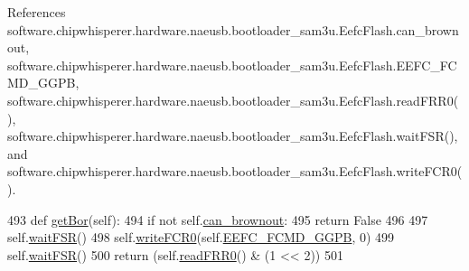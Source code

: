 References software.\+chipwhisperer.\+hardware.\+naeusb.\+bootloader\+\_\+sam3u.\+Eefc\+Flash.\+can\+\_\+brownout, software.\+chipwhisperer.\+hardware.\+naeusb.\+bootloader\+\_\+sam3u.\+Eefc\+Flash.\+E\+E\+F\+C\+\_\+\+F\+C\+M\+D\+\_\+\+G\+G\+P\+B, software.\+chipwhisperer.\+hardware.\+naeusb.\+bootloader\+\_\+sam3u.\+Eefc\+Flash.\+read\+F\+R\+R0(), software.\+chipwhisperer.\+hardware.\+naeusb.\+bootloader\+\_\+sam3u.\+Eefc\+Flash.\+wait\+F\+S\+R(), and software.\+chipwhisperer.\+hardware.\+naeusb.\+bootloader\+\_\+sam3u.\+Eefc\+Flash.\+write\+F\+C\+R0().


\begin{DoxyCode}
493     \textcolor{keyword}{def }\hyperlink{classsoftware_1_1chipwhisperer_1_1hardware_1_1naeusb_1_1bootloader__sam3u_1_1EefcFlash_a3050a591d5790e1414f45f43fc507f41}{getBor}(self):
494         \textcolor{keywordflow}{if} \textcolor{keywordflow}{not} self.\hyperlink{classsoftware_1_1chipwhisperer_1_1hardware_1_1naeusb_1_1bootloader__sam3u_1_1EefcFlash_a2a7305c795772d47fd04a1f3b5bcb3ab}{can\_brownout}:
495             \textcolor{keywordflow}{return} \textcolor{keyword}{False}
496 
497         self.\hyperlink{classsoftware_1_1chipwhisperer_1_1hardware_1_1naeusb_1_1bootloader__sam3u_1_1EefcFlash_af9c2a803cf623aa2ceeabeab912aa8b5}{waitFSR}()
498         self.\hyperlink{classsoftware_1_1chipwhisperer_1_1hardware_1_1naeusb_1_1bootloader__sam3u_1_1EefcFlash_aa255adaa75a4bd666c3b290b573ae7dd}{writeFCR0}(self.\hyperlink{classsoftware_1_1chipwhisperer_1_1hardware_1_1naeusb_1_1bootloader__sam3u_1_1EefcFlash_a4b6d6ba9361c5809db517cfad2bed323}{EEFC\_FCMD\_GGPB}, 0)
499         self.\hyperlink{classsoftware_1_1chipwhisperer_1_1hardware_1_1naeusb_1_1bootloader__sam3u_1_1EefcFlash_af9c2a803cf623aa2ceeabeab912aa8b5}{waitFSR}()
500         \textcolor{keywordflow}{return} (self.\hyperlink{classsoftware_1_1chipwhisperer_1_1hardware_1_1naeusb_1_1bootloader__sam3u_1_1EefcFlash_a5f9f770b5978e990b1c1f9f70d98c333}{readFRR0}() & (1 << 2))
501 
\end{DoxyCode}
\hypertarget{classsoftware_1_1chipwhisperer_1_1hardware_1_1naeusb_1_1bootloader__sam3u_1_1EefcFlash_a9870c451b9d6e12ca1a6dee070451611}{}
